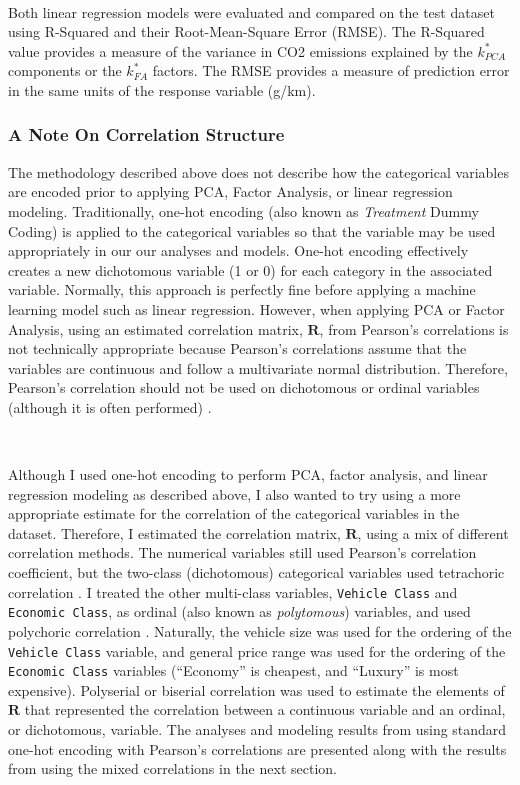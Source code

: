 \documentclass[11pt]{article}
\begin{document}
\

Both linear regression models were evaluated and compared on the test dataset using R-Squared and their Root-Mean-Square Error (RMSE). The R-Squared value provides a measure of the variance in CO2 emissions explained by the $k_{PCA}^*$ components or the $k_{FA}^*$ factors. The RMSE provides a measure of prediction error in the same units of the response variable (g/km). 

\subsubsection*{A Note On Correlation Structure}

The methodology described above does not describe how the categorical variables are encoded prior to applying PCA, Factor Analysis, or linear regression modeling. Traditionally, one-hot encoding (also known as \textit{Treatment} Dummy Coding) is applied to the categorical variables so that the variable may be used appropriately in our our analyses and models. One-hot encoding effectively creates a new dichotomous variable (1 or 0) for each category in the associated variable. Normally, this approach is perfectly fine before applying a machine learning model such as linear regression. However, when applying PCA or Factor Analysis, using an estimated correlation matrix, $\mathbf{R}$, from Pearson's correlations is not technically appropriate because Pearson's correlations assume that the variables are continuous and follow a multivariate normal distribution. Therefore, Pearson's correlation should not be used on dichotomous or ordinal variables (although it is often performed) \cite{uclaoarc}.

\

Although I used one-hot encoding to perform PCA, factor analysis, and linear regression modeling as described above, I also wanted to try using a more appropriate estimate for the correlation of the categorical variables in the dataset. Therefore, I estimated the correlation matrix, $\mathbf{R}$, using a mix of different correlation methods. The numerical variables still used Pearson's correlation coefficient, but the two-class (dichotomous) categorical variables used tetrachoric correlation \cite{mixedCorr}. I treated the other multi-class variables, \texttt{Vehicle Class} and \texttt{Economic Class}, as ordinal (also known as \textit{polytomous}) variables, and used polychoric correlation \cite{mixedCorr}. Naturally, the vehicle size was used for the ordering of the \texttt{Vehicle Class} variable, and general price range was used for the ordering of the \texttt{Economic Class} variables (``Economy'' is cheapest, and ``Luxury'' is most expensive). Polyserial or biserial correlation was used to estimate the elements of $\mathbf{R}$ that represented the correlation between a continuous variable and an ordinal, or dichotomous, variable. The analyses and modeling results from using standard one-hot encoding with Pearson's correlations are presented along with the results from using the mixed correlations in the next section.
\end{document}
